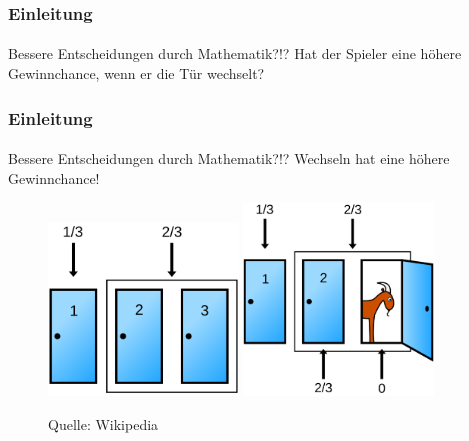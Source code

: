 \documentclass{beamer}
\begin{document}
\begin{frame}
    \frametitle{Einleitung}
\framesubtitle{}

\begin{block}{Bessere Entscheidungen durch Mathematik?!?}
Hat der Spieler eine höhere Gewinnchance, wenn er die Tür wechselt?
\end{block}

 \end{frame}

\begin{frame}
    \frametitle{Einleitung}
\framesubtitle{}

\begin{block}{Bessere Entscheidungen durch Mathematik?!?}
Wechseln hat eine höhere Gewinnchance!
\end{block}

\begin{figure}[htp]
      \centering
    \includegraphics[width=0.45\textwidth]{img/Monty_closed_1}
    \includegraphics[width=0.45\textwidth]{img/Monty_open_1}
      \caption{Quelle: Wikipedia}
\end{figure}

 \end{frame}
\end{document}
